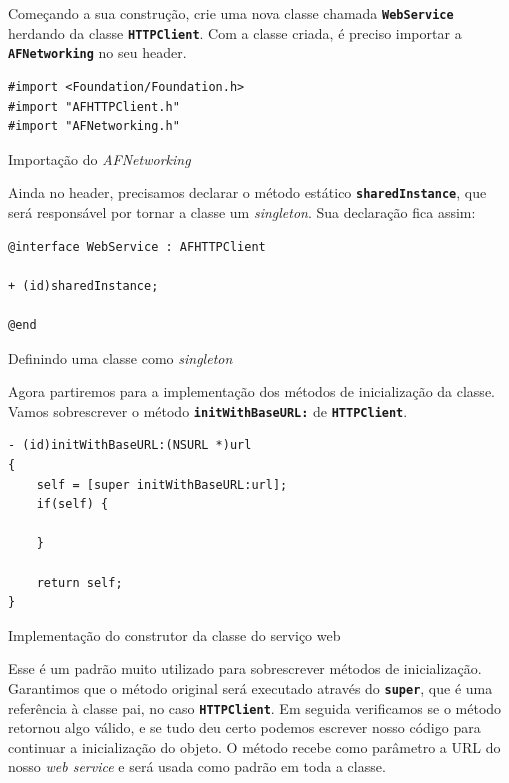 \documentclass[a4paper,12pt,brazil,doubleside]{book}
\begin{document}
\begin{singlespace}
Começando a sua construção, crie uma nova classe chamada \texttt{\textbf{WebService}} herdando da classe \texttt{\textbf{HTTPClient}}. Com a classe criada, é preciso importar a \texttt{\textbf{AFNetworking}} no seu header.

\begin{listing}[H]
\begin{verbatim}
#import <Foundation/Foundation.h>
#import "AFHTTPClient.h"
#import "AFNetworking.h"
\end{verbatim}
\caption{Importação do \emph{AFNetworking}}
\end{listing}


Ainda no header, precisamos declarar o método estático \texttt{\textbf{sharedInstance}}, que será responsável por tornar a classe um \emph{singleton}. Sua declaração fica assim:

\begin{listing}[H]
\begin{verbatim}
@interface WebService : AFHTTPClient

+ (id)sharedInstance;

@end
\end{verbatim}
\caption{Definindo uma classe como \emph{singleton}}
\end{listing}


Agora partiremos para a implementação dos métodos de inicialização da classe. Vamos sobrescrever o método \texttt{\textbf{initWithBaseURL:}} de \texttt{\textbf{HTTPClient}}.

\begin{listing}[H]
\begin{verbatim}
- (id)initWithBaseURL:(NSURL *)url
{
    self = [super initWithBaseURL:url];
    if(self) {
    
    }
    
    return self;
}
\end{verbatim}
\caption{Implementação do construtor da classe do serviço web}
\end{listing}


Esse é um padrão muito utilizado para sobrescrever métodos de inicialização. Garantimos que o método original será executado através do \texttt{\textbf{super}}, que é uma referência à classe pai, no caso  \texttt{\textbf{HTTPClient}}. Em seguida verificamos se o método retornou algo válido, e se tudo deu certo podemos escrever nosso código para continuar a inicialização do objeto. O método recebe como parâmetro a URL do nosso \emph{web service} e será usada como padrão em toda a classe.


\end{singlespace}
\end{document}
